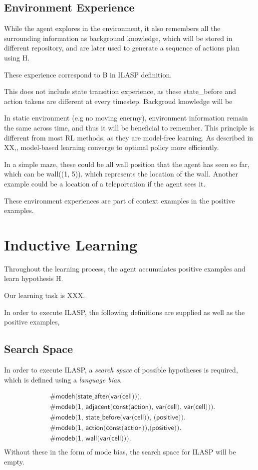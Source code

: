 \subsection{Environment Experience}

While the agent explores in the environment, it also remembers all the surrounding information as background knowledge, 
which will be stored in different repository, and are later used to generate a sequence of actions plan using H.

These experience correspond to B in ILASP definition. 

This does not include state transition experience, as these state\_before and action takens are different at every timestep.
Backgroud knowledge will be 

In static environment (e.g no moving enermy), environment information remain the same across time, and thus it will be beneficial to remember. 
This principle is different from most RL methods, as they are model-free learning. 
As described in XX,, model-based learning converge to optimal policy more efficiently. 

In a simple maze, these could be all wall position that the agent has seen so far, which can be 
wall((1, 5)). which represents the location of the wall. 
Another example could be a location of a teleportation if the agent sees it. 

These environment experiences are part of context examples in the positive examples. 

\section{Inductive Learning}
\label{induction}
Throughout the learning process, the agent accumulates positive examples and learn hypothesis H. 

Our learning task is XXX.

In order to execute ILASP, the following definitions are supplied as well as the positive examples,

\subsection{Search Space}
In order to execute ILASP, a \textit{search space} of possible hypotheses is required, which is defined using a \textit{language bias}. 

\begin{equation}
\begin{split}    
&\textsf{\#modeh(state\_after(var(cell))).}\\
&\textsf{\#modeb(1, adjacent(const(action), var(cell), var(cell))).} \\
&\textsf{\#modeb(1, state\_before(var(cell)), (positive)).} \\
&\textsf{\#modeb(1, action(const(action)),(positive)).} \\
&\textsf{\#modeb(1, wall(var(cell))).} \\
\end{split}
\end{equation}
Without these in the form of mode bias, the search space for ILASP will be empty. 


